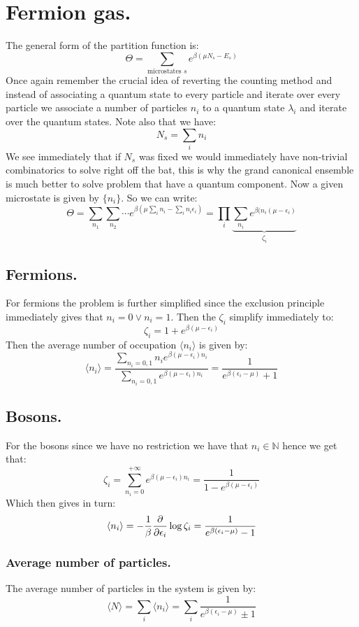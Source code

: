 \documentclass[10pt,a4paper]{book}
\begin{document}
\section{Fermion gas.}
The general form of the partition function is:
\[
\Theta = \sum_{\text{microstates } s} e^{\beta(\mu N_s - E_s)}
\]
Once again remember the crucial idea of reverting the counting method and instead of associating a quantum state to every particle and iterate over every particle we associate a number of particles $n_i$ to a quantum state $\lambda_i$ and iterate over the quantum states. Note also that we have:
\[
N_s = \sum_{i} n_i
\]
We see immediately that if $N_s$ was fixed we would immediately have non-trivial combinatorics to solve right off the bat, this is why the grand canonical ensemble is much better to solve problem that have a quantum component. Now a given microstate is given by $\{n_i\}$. So we can write:
\[
\Theta = \sum_{n_1} \sum_{n_2} \cdots e^{\beta (\mu \sum_i n_i - \sum_i n_i \epsilon_i)} = \prod_i \underbrace{\sum_{n_i} e^{\beta (n_i (\mu - \epsilon_i)}}_{\zeta_i}
\]
\subsection{Fermions.}
For fermions the problem is further simplified since the exclusion principle immediately gives that $n_i = 0 \lor n_i = 1$. Then the $\zeta_i$ simplify immediately to:
\[
\zeta_i = 1 + e^{\beta(\mu - \epsilon_i)}
\]
Then the average number of occupation $\langle n_i \rangle$ is given by:
\[
\langle n_i \rangle = \frac{\sum_{n_i = 0, 1} n_i e^{\beta(\mu - \epsilon_i)n_i}}{\sum_{n_i = 0, 1} e^{\beta(\mu - \epsilon_i)n_i}} = \frac{1}{e^{\beta(\epsilon_i - \mu)} + 1}
\]
\subsection{Bosons.}
For the bosons since we have no restriction we have that $n_i \in \mathbb{N}$ hence we get that:
\[
\zeta_i = \sum_{n_i = 0}^{+\infty} e^{\beta(\mu - \epsilon_i)n_i} = \frac{1}{1 - e^{\beta(\mu - \epsilon_i)}}
\]
Which then gives in turn:
\[
\langle n_i \rangle  = - \frac{1}{\beta} \pdv{}{\epsilon_i} \log \zeta_i = \frac{1}{e^{\beta(\epsilon_i - \mu)} - 1}
\]
\subsubsection{Average number of particles.}
The average number of particles in the system is given by:
\[
\langle N \rangle = \sum_i \langle n_i \rangle = \sum_i \frac{1}{e^{\beta(\epsilon_i - \mu)} \pm 1}
\]
\end{document}

